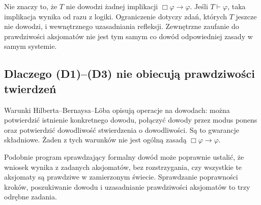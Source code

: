 Nie znaczy to, że $T$ nie dowodzi żadnej implikacji $\Box\varphi\to\varphi$. Jeśli $T\vdash\varphi$, taka implikacja wynika od razu z logiki. Ograniczenie dotyczy zdań, których $T$ jeszcze nie dowodzi, i wewnętrznego uzasadniania refleksji. Zewnętrzne zaufanie do prawdziwości aksjomatów nie jest tym samym co dowód odpowiedniej zasady w samym systemie.

\subsection*{Dlaczego (D1)--(D3) nie obiecują prawdziwości twierdzeń}\label{sec:17:4}
Warunki Hilberta--Bernaysa--Löba opisują operacje na dowodach: można potwierdzić istnienie konkretnego dowodu, połączyć dowody przez modus ponens oraz potwierdzić dowodliwość stwierdzenia o dowodliwości. Są to gwarancje składniowe. Żaden z tych warunków nie jest ogólną zasadą $\Box\varphi\to\varphi$.

Podobnie program sprawdzający formalny dowód może poprawnie ustalić, że wniosek wynika z zadanych aksjomatów, bez rozstrzygania, czy wszystkie te aksjomaty są prawdziwe w zamierzonym świecie. Sprawdzanie poprawności kroków, poszukiwanie dowodu i uzasadnianie prawdziwości aksjomatów to trzy odrębne zadania.

